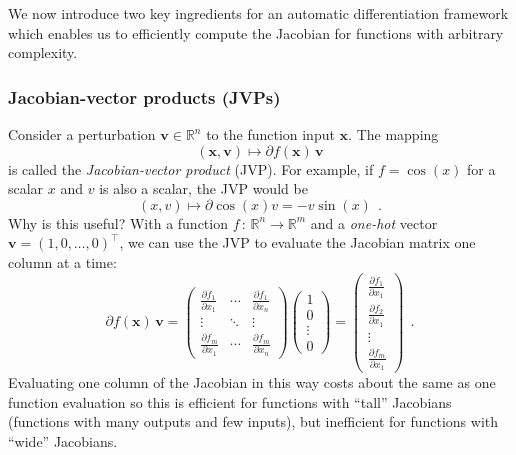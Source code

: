 \documentclass[12pt,dvipsnames]{report}
\renewcommand{\vec}[1]{\boldsymbol{\mathbf{#1}}}
\newcommand{\hquad}{~~}
\begin{document}
We now introduce two key ingredients for an automatic differentiation framework 
which enables us to efficiently compute the Jacobian for functions with arbitrary 
complexity.

\subsubsection{Jacobian-vector products (JVPs)}
Consider a perturbation $\vec v\in\mathbb{R}^n$ to the function input 
$\vec x$. The  mapping 
\begin{equation}
(\vec{x}, \vec{v}) \mapsto \partial f(\vec{x})\,\vec v
\label{eq:jvp}
\end{equation}
is called the \emph{Jacobian-vector product} (JVP). For example, if $f=\cos(x)$ 
for a scalar $x$ and $v$ is also a scalar, the JVP would be 
\begin{equation}
(x, v) \mapsto \partial \cos (x) v=-v \sin (x)
\hquad.
\end{equation}
Why is this useful? With a function $f\,:\,\mathbb{R}^n\rightarrow\mathbb{R}^m$
and a \emph{one-hot} vector $\vec v=(1, 0, \ldots, 0)^\intercal$, we can use the JVP to 
evaluate the Jacobian matrix one column at a time:
\begin{equation}
    \partial f(\vec x)\,\vec v = 
    \begin{pmatrix}
\frac{\partial f_{1}}{\partial x_{1}} & \cdots & \frac{\partial f_{1}}{\partial x_{n}} \\
\vdots & \ddots & \vdots \\
\frac{\partial f_{m}}{\partial x_{1}} & \cdots & \frac{\partial f_{m}}{\partial x_{n}}
    \end{pmatrix}
    \begin{pmatrix}
        1\\
        0\\
        \vdots\\
        0
    \end{pmatrix}
    = \begin{pmatrix}
        \frac{\partial f_{1}}{\partial x_{1}}\\
        \frac{\partial f_{2}}{\partial x_{1}}\\
        \vdots\\
        \frac{\partial f_{m}}{\partial x_{1}}
    \end{pmatrix}
    \hquad.
\end{equation}
Evaluating one column of the Jacobian in this way costs about the same as one function evaluation
so this is efficient for functions with ``tall'' Jacobians (functions with many outputs and few
inputs), but inefficient for functions with ``wide'' Jacobians.
\end{document}
